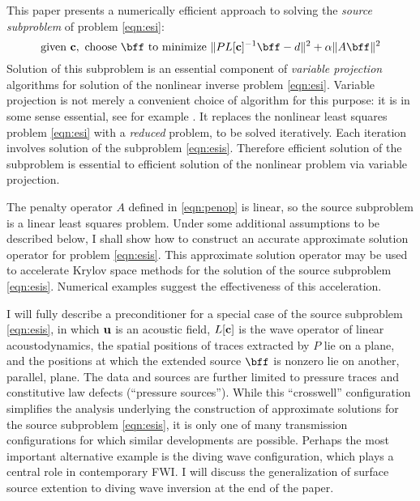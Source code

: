 This paper presents a numerically efficient approach to solving the
{\em source subproblem} of problem \ref{eqn:esi}:
\begin{equation}
\label{eqn:esis}
\mbox{given } {\bf c}, \mbox{ choose } \bff \mbox{ to minimize }
\|PL[{\bf c}]^{-1}\bff -d \|^2 + \alpha \|A\bff\|^2 
\end{equation}
Solution of this subproblem is an essential component of {\em variable
  projection} algorithms for solution of the nonlinear inverse problem
\ref{eqn:esi}. Variable projection is not merely a convenient choice
of algorithm for this purpose: it is in some sense essential, see for
example \cite{Symes:SEG20}. It replaces the nonlinear
least squares problem \ref{eqn:esi} with a {\em reduced} problem, to
be solved iteratively. Each iteration involves solution of the
subproblem \ref{eqn:esis}. Therefore efficient solution of the
subproblem is essential to efficient solution of the nonlinear problem
via variable projection.

The penalty operator $A$ defined in \ref{eqn:penop} is linear, so the source
subproblem is a linear least squares problem. Under some additional
assumptions to be described below, I shall show how to construct an
accurate approximate solution operator for problem
\ref{eqn:esis}. This approximate solution operator may be used to
accelerate Krylov space methods for the solution of the source
subproblem \ref{eqn:esis}. Numerical examples suggest the
effectiveness of this acceleration.

I will fully describe a preconditioner for a special
case of the source subproblem \ref{eqn:esis}, in which ${\bf u}$ is an
acoustic field, $L[{\bf c}]$ is the wave operator of linear
acoustodynamics, the spatial positions of traces extracted by $P$ lie
on a plane, and the positions at which the extended
source $\bff$ is nonzero lie on another, parallel, plane. The data and
sources are further limited to pressure traces and constitutive law
defects (``pressure sources''). While this
``crosswell'' configuration simplifies the analysis underlying the
construction of approximate solutions for the source subproblem
\ref{eqn:esis}, it is only one of many transmission configurations for
which similar developments are possible. Perhaps the most important
alternative example is the diving wave configuration, which plays a
central role in contemporary FWI. I will discuss the generalization of
surface source extention to diving wave inversion at the end of the
paper.

